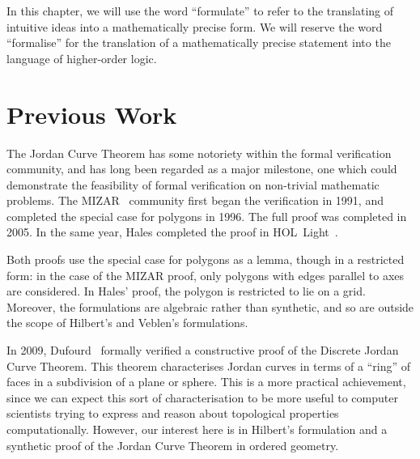 In this chapter, we will use the word ``formulate'' to refer to the translating of intuitive ideas into a mathematically precise form. We will reserve the word ``formalise'' for the translation of a mathematically precise statement into the language of higher-order logic.

\section{Previous Work}
The Jordan Curve Theorem has some notoriety within the formal verification community, and has long been regarded as a major milestone, one which could demonstrate the feasibility of formal verification on non-trivial mathematic problems. The MIZAR~\cite{MizarMathematicalVernacular} community first began the verification in 1991, and completed the special case for polygons in 1996. The full proof was completed in 2005. In the same year, Hales completed the proof in HOL~Light~\cite{HalesJordanCurve}. 

Both proofs use the special case for polygons as a lemma, though in a restricted form: in the case of the MIZAR proof, only polygons with edges parallel to axes are considered. In Hales' proof, the polygon is restricted to lie on a grid. Moreover, the formulations are algebraic rather than synthetic, and so are outside the scope of Hilbert's and Veblen's formulations.

In 2009, Dufourd~\cite{DufourdJordanCurve} formally verified a constructive proof of the Discrete Jordan Curve Theorem. This theorem characterises Jordan curves in terms of a ``ring'' of faces in a subdivision of a plane or sphere. This is a more practical achievement, since we can expect this sort of characterisation to be more useful to computer scientists trying to express and reason about topological properties computationally. However, our interest here is in Hilbert's formulation and a synthetic proof of the Jordan Curve Theorem in ordered geometry.


